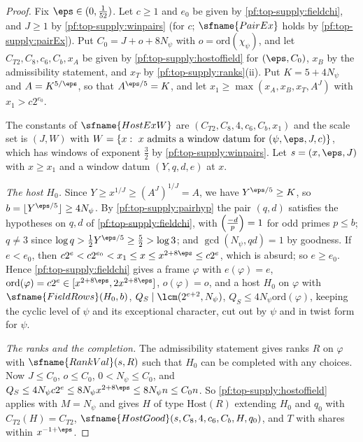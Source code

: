\begin{proof}
Fix $\eps\in(0,\frac1{52})$. Let $c\ge1$ and $e_0$ be given by \cref{pf:top-supply:fieldchi}, and $J\ge1$ by
\cref{pf:top-supply:winpairs} (for $c$; $\sfname{PairEx}$ holds by \cref{pf:top-supply:pairEx}). Put
$C_0=J+o+8N_\psi$ with $o=\mathrm{ord}(\chi_\psi)$, and let $C_{T2},C_8,c_6,C_b,x_A$ be given by \cref{pf:top-supply:hostoffield} for
$(\eps,C_0)$, $x_B$ by the admissibility statement, and $x_T$ by \cref{pf:top-supply:ranks}(ii). Put $K=5+4N_\psi$ and
$A=K^{5/\eps}$, so that $A^{\eps/5}=K$, and let $x_1\ge\max(x_A,x_B,x_T,A^J)$ with $x_1>c2^{e_0}$.

The constants of $\sfname{HostExW}$ are $(C_{T2},C_8,4,c_6,C_b,x_1)$ and the scale set is $(J,W)$ with
$W=\{x:\ x\text{ admits a window datum for }(\psi,\eps,J,c)\}$, which has windows of exponent $\frac32$ by
\cref{pf:top-supply:winpairs}. Let $s=(x,\eps,J)$ with $x\ge x_1$ and a window datum $(Y,q,d,e)$ at $x$.

\emph{The host $H_0$.} Since $Y\ge x^{1/J}\ge(A^J)^{1/J}=A$, we have $Y^{\eps/5}\ge K$, so $b=\lfloor Y^{\eps/5}\rfloor\ge4N_\psi$.
By \cref{pf:top-supply:pairhyp} the pair $(q,d)$ satisfies the hypotheses on $q,d$ of \cref{pf:top-supply:fieldchi}, with
$\left(\frac{-d}{p}\right)=1$ for odd primes $p\le b$; $q\ne3$ since $\log q>\frac12Y^{\eps/5}\ge\frac52>\log3$; and
$\gcd(N_\psi,qd)=1$ by goodness. If $e<e_0$, then $c2^e<c2^{e_0}<x_1\le x\le x^{2+8\eps}\le c2^e$, which is absurd; so
$e\ge e_0$. Hence \cref{pf:top-supply:fieldchi} gives a frame $\varphi$ with $e(\varphi)=e$, $\mathrm{ord}(\varphi)=c2^e\in
[x^{2+8\eps},2x^{2+8\eps}]$, $o(\varphi)=o$, and a host $H_0$ on $\varphi$ with $\sfname{FieldRows}(H_0,b)$,
$Q_S\mid\lcm(2^{e+2},N_\psi)$, $Q_S\le4N_\psi\mathrm{ord}(\varphi)$, keeping the cyclic level of $\psi$ and its exceptional
character, cut out by $\psi$ and in twist form for $\psi$.

\emph{The ranks and the completion.} The admissibility statement gives ranks $R$ on $\varphi$ with $\sfname{RankVal}(s,R)$ such
that $H_0$ can be completed with any choices. Now $J\le C_0$, $o\le C_0$, $0<N_\psi\le C_0$, and
$Q_S\le4N_\psi c2^e\le8N_\psi x^{2+8\eps}\le8N_\psi n\le C_0n$. So \cref{pf:top-supply:hostoffield} applies with $M=N_\psi$ and
gives $H$ of type $\mathrm{Host}(R)$ extending $H_0$ and $q_0$ with $C_{T2}(H)=C_{T2}$, $\sfname{HostGood}(s,C_8,4,c_6,C_b,H,q_0)$,
and $T$ with shares within $x^{-1+\eps}$.


\end{proof}
